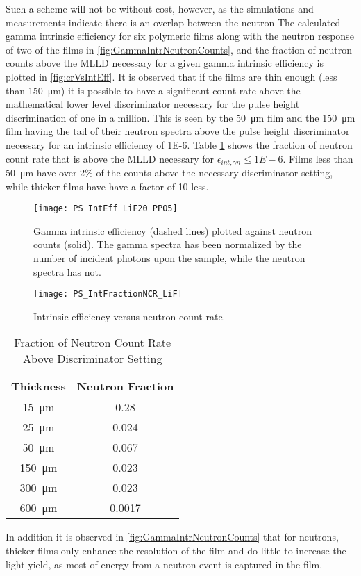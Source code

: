 Such a scheme will not be without cost, however, as the simulations and measurements indicate there is an overlap between the neutron 
The calculated gamma intrinsic efficiency for six polymeric films along with the neutron response of two of the films in \autoref{fig:GammaIntrNeutronCounts}, and the fraction of neutron counts above the MLLD necessary for a given gamma intrinsic efficiency is plotted in \autoref{fig:crVsIntEff}.
It is observed that if the films are thin enough (less than \SI{150}{\um}) it is possible to have a significant count rate above the mathematical lower level discriminator necessary for the pulse height discrimination of one in a million.
This is seen by the \SI{50}{\um} film and the \SI{150}{\um} film having the tail of their neutron spectra above the pulse height discriminator necessary for an intrinsic efficiency of \num{1E-6}.
Table \ref{tab:FractionCRGamma} shows the fraction of neutron count rate that is above the MLLD necessary for $\epsilon_{int,\gamma n} \le \si{1E-6}$.
Films less than \SI{50}{\um} have over 2\% of the counts above the necessary discriminator setting, while thicker films have have a factor of 10 less.
\begin{figure}[ht]
    \centering
    \texttt{[image: PS\_IntEff\_LiF20\_PPO5]}
    \caption[PS Gamma intrinsic efficiency and neutron count rate]{Gamma intrinsic efficiency (dashed lines) plotted against neutron counts (solid). The gamma spectra has been normalized by the number of incident photons upon the sample, while the neutron spectra has not.}
    \label{fig:GammaIntrNeutronCounts}
\end{figure}
\begin{figure}[ht]
    \centering
    \texttt{[image: PS\_IntFractionNCR\_LiF]}
    \caption{Intrinsic efficiency versus neutron count rate. }
    \label{fig:crVsIntEff}
\end{figure}
\begin{table}[]
    \caption{Fraction of Neutron Count Rate Above Discriminator Setting}
	\centering
	\begin{tabular}{c | c}
	Thickness & Neutron Fraction \\
	\hline
	\hline
	\SI{15}{\um} & 0.28 \\
	\SI{25}{\um} & 0.024 \\
	\SI{50}{\um}  & 0.067 \\
	\SI{150}{\um}  & 0.023 \\
	\SI{300}{\um}  & 0.023 \\
	\SI{600}{\um}  & 0.0017 \\
	\end{tabular}
  \label{tab:FractionCRGamma}
\end{table}
In addition it is observed in \autoref{fig:GammaIntrNeutronCounts} that for neutrons, thicker films only enhance the resolution of the film and do little to increase the light yield, as most of energy from a neutron event is captured in the film.